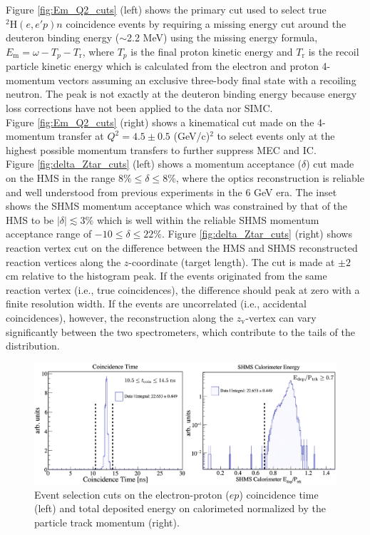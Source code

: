 \documentclass[aps, prl]{revtex4-2}  %
\begin{document}
\indent Figure \ref{fig:Em_Q2_cuts} (left) shows the primary cut used to select true $^{2}\mathrm{H}(e,e'p)n$ coincidence events by requiring a missing
energy cut around the deuteron binding energy ($\sim$2.2 MeV) using the missing energy formula, $E_{\mathrm{m}} = \omega - T_{p} - T_{\mathrm{r}}$, where
$T_{p}$ is the final proton kinetic energy and $T_{\mathrm{r}}$ is the recoil particle kinetic energy which is calculated from the electron and proton
4-momentum vectors assuming an exclusive three-body final state with a recoiling neutron. The peak is not exactly at the deuteron binding energy because
energy loss corrections have not been applied to the data nor SIMC. \\
\indent Figure \ref{fig:Em_Q2_cuts} (right) shows a
kinematical cut made on the 4-momentum transfer at $Q^{2} = 4.5\pm0.5$ (GeV/c)$^{2}$
to select events only at the highest possible momentum transfers to further suppress MEC and IC. \\
\indent Figure \ref{fig:delta_Ztar_cuts} (left) shows a momentum acceptance ($\delta$) cut made on the HMS in the range $8\%\leq\delta\leq8\%$, where the optics reconstruction
is reliable and well understood from previous experiments in the 6 GeV era. The inset shows the SHMS momentum acceptance which was constrained by that of the HMS to be
$|\delta|\lesssim$3$\%$ which is well within the reliable SHMS momentum acceptance range of $-10 \leq \delta \leq22 \%$. Figure \ref{fig:delta_Ztar_cuts} (right) shows reaction vertex cut
on the difference between the HMS and SHMS reconstructed reaction vertices along the $z$-coordinate (target length). The cut is made at $\pm2$ cm relative to the histogram peak.
If the events originated from the same reaction vertex (i.e., true coincidences), the difference should peak at zero with a finite resolution width. If the events are uncorrelated
(i.e., accidental coincidences), however, the reconstruction along the $z_{\mathrm{v}}$-vertex can vary significantly between the two spectrometers, which contribute to the tails of the
distribution.\\
\begin{figure}[!h]
\includegraphics[scale=0.23]{plots/coin_and_eCal_CUT_80MeV_35deg.png}
\caption{Event selection cuts on the electron-proton ($ep$) coincidence time (left) and total deposited energy on calorimeted normalized by the particle track momentum (right).}
\label{fig:coin_ecal_cuts}
\end{figure}\\
\end{document}
